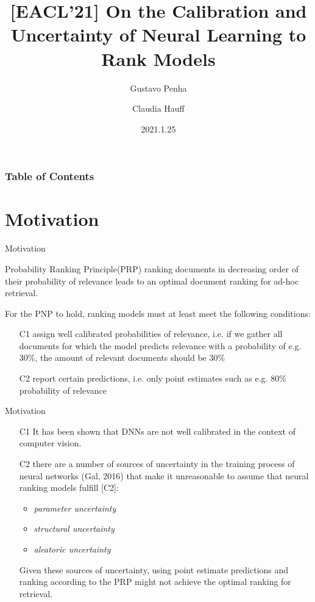 \documentclass{beamer}
\title[PaperSharing-(EACL'21)LTR]{[EACL'21] On the Calibration and Uncertainty of Neural Learning to Rank Models}
\author[Shengqiang Zhang]{Gustavo Penha \and Claudia Hauff}
\institute[Baidu]{Delft University of Technology, Delft}
\date{2021.1.25}
\begin{document}
\frame{\titlepage}

\begin{frame}
\frametitle{Table of Contents}
\tableofcontents
\end{frame}

\section{Motivation}
\begin{frame}{Motivation}
    \begin{block}{Probability Ranking Principle(PRP)}
    ranking documents in decreasing order of their probability of relevance leads to an optimal document ranking for ad-hoc retrieval.
    \end{block}
    
    For the PNP to hold, ranking models must at least meet the following conditions:
    \begin{itemize}
        \item [C1] assign well calibrated probabilities of relevance, i.e. if we gather all documents for which the model predicts relevance with a probability of e.g. 30\%, the amount of relevant documents should be 30\%
        \item [C2] report certain predictions, i.e. only point estimates such as e.g. 80\% probability of relevance
    \end{itemize}
    
\end{frame}

\begin{frame}{Motivation}
\begin{itemize}
    \item [C1] It has been shown that DNNs are not well calibrated in the context of computer vision\cite{Guo2017OnCO}.
    \item [C2] there are a number of sources of uncertainty in the training process of neural networks (Gal, 2016) that make it unreasonable to assume that neural ranking models fulfill [C2]: 
    \begin{itemize}
        \item \textsl{parameter uncertainty}
        \item \textsl{structural uncertainty}
        \item \textsl{aleatoric uncertainty}
    \end{itemize}
    Given these sources of uncertainty, using point estimate predictions and ranking according to the PRP might not achieve the optimal ranking for retrieval.
\end{itemize}
\end{frame}
\end{document}
